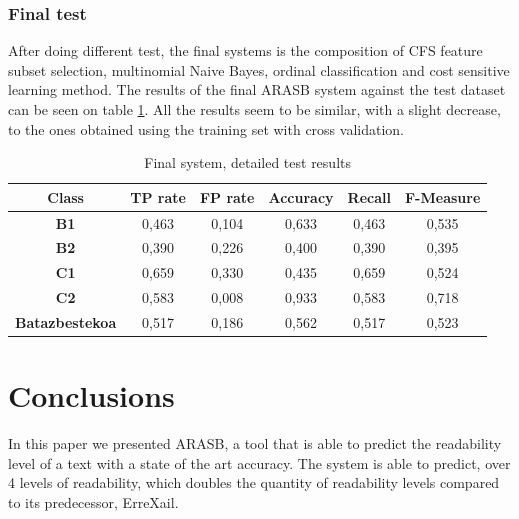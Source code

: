\documentclass{acm_proc_article-sp}
\begin{document}
\subsubsection{Final test}
After doing different test, the final systems is the composition of CFS feature subset selection, multinomial Naive Bayes, ordinal classification and cost sensitive learning method. The results of the final ARASB system against the test dataset can be seen on table \ref{tab:aukeratuaestatistikakTest}. All the results seem to be similar, with a slight decrease, to the ones obtained using the training set with cross validation.




\begin{table}
 \begin{center}
 \begin{tabular}{|c|c|c|c|c|c|}\hline

 {\bf Class }     &{\bf TP rate}   & {\bf FP rate} & {\bf Accuracy} & {\bf Recall}  &  {\bf F-Measure}   \\ \hline
 {\bf B1   }       &      0,463    &  0,104  &    0,633   &     0,463   &   0,535             \\ \hline
 {\bf B2   }       &      0,390    &  0,226    &  0,400    &    0,390    &  0,395              \\ \hline
 {\bf C1   }       &      0,659   &   0,330    &  0,435    &    0,659    &  0,524              \\ \hline
 {\bf C2   }       &      0,583    &  0,008    &  0,933     &   0,583   &   0,718           \\ \hline
{\bf Batazbestekoa } &    0,517  &    0,186  &    0,562  &      0,517   &   0,523             \\ \hline
  
 \end{tabular}
 \end{center}
 \caption{Final system, detailed test results}
 \label{tab:aukeratuaestatistikakTest}
\end{table}  

\section{Conclusions}
In this paper we presented ARASB, a tool that is able to predict the readability level of a text with a state of the art accuracy. The system is able to predict, over 4 levels of readability, which doubles the quantity of readability levels compared to its predecessor, ErreXail.
\end{document}
